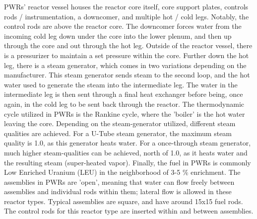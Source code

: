 \documentclass{article}
\begin{document}
PWRs' reactor vessel houses the reactor core itself, core support plates, controls rods / instrumentation, a downcomer, and multiple hot / cold legs. Notably, the control rods are above the reactor core. The downcomer forces water from the incoming cold leg down under the core into the lower plenum, and then up through the core and out through the hot leg. Outside of the reactor vessel, there is a pressurizer to maintain a set pressure within the core. Further down the hot leg, there is a steam generator, which comes in two variations depending on the manufacturer. This steam generator sends steam to the second loop, and the hot water used to generate the steam into the intermediate leg. The water in the intermediate leg is then sent through a final heat exchanger before being, once again, in the cold leg to be sent back through the reactor. The thermodynamic cycle utilized in PWRs is the Rankine cycle, where the 'boiler' is the hot water leaving the core. Depending on the steam-generator utilized, different steam qualities are achieved. For a U-Tube steam generator, the maximum steam quality is 1.0, as this generator heats water. For a once-through steam generator, much higher steam-qualities can be achieved, north of 1.0, as it heats water and the resulting steam (super-heated vapor). Finally, the fuel in PWRs is commonly Low Enriched Uranium (LEU) in the neighborhood of 3-5 \% enrichment. The assemblies in PWRs are 'open', meaning that water can flow freely between assemblies and individual rods within them; lateral flow is allowed in these reactor types. Typical assemblies are square, and have around 15x15 fuel rods. The control rods for this reactor type are inserted within and between assemblies. 
\end{document}
